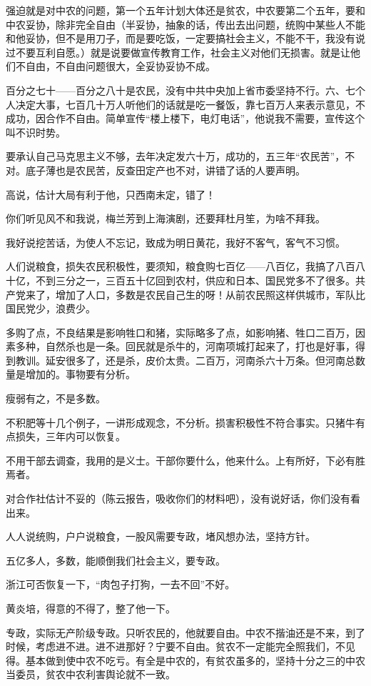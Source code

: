 强迫就是对中农的问题，第一个五年计划大体还是贫农，中农要第二个五年，要和中农妥协，除非完全自由（半妥协，抽象的话，传出去出问题，统购中某些人不能和他妥协，但不是用刀子，而是要吃饭，一定要搞社会主义，不能不干，我没有说过不要互利自愿。）就是说要做宣传教育工作，社会主义对他们无损害。就是让他们不自由，不自由问题很大，全妥协妥协不成。

百分之七十——百分之八十是农民，没有中共中央加上省市委坚持不行。六、七个人决定大事，七百几十万人听他们的话就是吃一餐饭，靠七百万人来表示意见，不成功，因合作不自由。简单宣传“楼上楼下，电灯电话”，他说我不需要，宣传这个叫不识时势。

要承认自己马克思主义不够，去年决定发六十万，成功的，五三年“农民苦”，不对。底子薄也是农民苦，反查田定产也不对，讲错了话的人要声明。

高说，估计大局有利于他，只西南未定，错了！

你们听见风不和我说，梅兰芳到上海演剧，还要拜杜月笙，为啥不拜我。

我好说挖苦话，为使人不忘记，致成为明日黄花，我好不客气，客气不习惯。

人们说粮食，损失农民积极性，要须知，粮食购七百亿——八百亿，我搞了八百八十亿，不到三分之一，三百五十亿回到农村，供应和日本、国民党多不了很多。共产党来了，增加了人口，多数是农民自己生的呀！从前农民照这样供城市，军队比国民党少，浪费少。

多购了点，不良结果是影响牲口和猪，实际略多了点，如影响猪、牲口二百万，因素多种，自然杀也是一条。回民就是杀牛的，河南项城打起来了，打也是好事，得到教训。延安很多了，还是杀，皮价太贵。二百万，河南杀六十万条。但河南总数量是增加的。事物要有分析。

瘦弱有之，不是多数。

不积肥等十几个例子，一讲形成观念，不分析。损害积极性不符合事实。只猪牛有点损失，三年内可以恢复。

不用干部去调查，我用的是义士。干部你要什么，他来什么。上有所好，下必有胜焉者。

对合作社估计不妥的（陈云报告，吸收你们的材料吧），没有说好话，你们没有看出来。

人人说统购，户户说粮食，一股风需要专政，堵风想办法，坚持方针。

五亿多人，多数，能顺倒我们社会主义，要专政。

浙江可否恢复一下，“肉包子打狗，一去不回”不好。

黄炎培，得意的不得了，整了他一下。

专政，实际无产阶级专政。只听农民的，他就要自由。中农不揩油还是不来，到了时候，考虑进不进。进不进那好？宁要不自由。贫农不一定能完全照我们，不见得。基本做到使中农不吃亏。有全是中农的，有贫农虽多的，坚持十分之三的中农当委员，贫农中农利害舆论就不一致。

